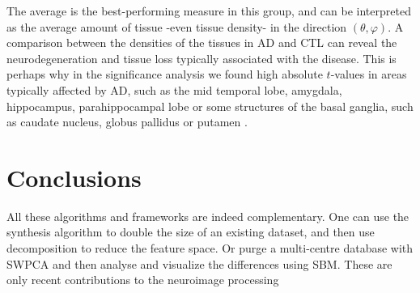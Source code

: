 The average is the best-performing measure in this group, and can be interpreted as the average amount of tissue -even tissue density- in the direction $(\theta,\varphi)$. A comparison between the densities of the tissues in \ac{AD} and \ac{CTL} can reveal the neurodegeneration and tissue loss typically associated with the disease. This is perhaps why in the significance analysis we found high absolute $t$-values in areas typically affected by \ac{AD}, such as the mid temporal lobe, amygdala, hippocampus, parahippocampal lobe or some structures of the basal ganglia, such as caudate nucleus, globus pallidus or putamen \cite{Dubois2007,Pievani2013}. 




\section{Conclusions}


All these algorithms and frameworks are indeed complementary. One can use the synthesis algorithm to double the size of an existing dataset, and then use decomposition to reduce the feature space. Or purge a multi-centre database with \ac{SWPCA} and then analyse and visualize the differences using \ac{SBM}. These are only recent contributions to the neuroimage processing 

